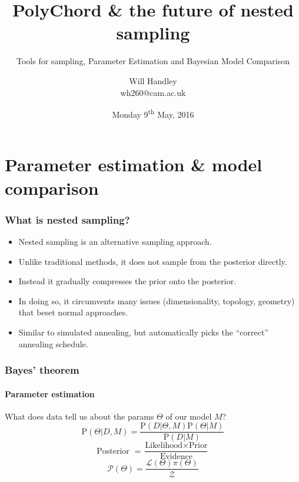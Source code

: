 \documentclass[]{beamer}
\title{PolyChord \& the future of nested sampling}
\subtitle{Tools for sampling, Parameter Estimation and Bayesian Model Comparison}
\author[Handley] %
{Will Handley\\ \small{wh260@cam.ac.uk}}
\institute[University of Cambridge] %
{%
Supervisors: Anthony Lasenby \& Mike Hobson \\
Astrophysics Group \\
Cavendish Laboratory \\
University of Cambridge
}
\date{Monday 9\textsuperscript{th} May, 2016}
\newcommand{\lik}{\mathcal{L}}
\newcommand{\posterior}{\mathcal{P}}
\newcommand{\prior}{\pi}
\newcommand{\ev}{\mathcal{Z}}
\newcommand{\prob}{\mathrm{P}}
\begin{document}
\begin{frame}
  \titlepage
\end{frame}

\begin{frame}
  \tableofcontents
\end{frame}


\section{Parameter estimation \& model comparison}
%
%
%

\begin{frame}
  \frametitle{What is nested sampling?}
  \begin{itemize}
    \pause\item Nested sampling is an alternative sampling approach. 
    \pause\item Unlike traditional methods, it does not sample from the posterior directly.
    \pause\item Instead it gradually compresses the prior onto the posterior.
    \pause\item In doing so, it circumvents many issues (dimensionality, topology, geometry) that beset normal approaches.
    \pause\item Similar to simulated annealing, but automatically picks the ``correct'' annealing schedule.
  \end{itemize}
\end{frame}

\begin{frame}
  \frametitle{Bayes' theorem}
  \framesubtitle{Parameter estimation}

  \pause
  What does data tell us about the params $\Theta$ of our model $M$?
    \[\prob(\Theta|D,M) = \frac{\prob(D|\Theta,M) \prob(\Theta|M) }{ \prob(D|M) }\] 
    \pause
    \[\text{Posterior } = \frac{\text{Likelihood} \times \text{Prior} } {\text{Evidence} }\] 
    \pause
    \[ \posterior(\Theta)= \frac{\lik(\Theta) \prior(\Theta)} {\ev}\] 

\end{frame}
\end{document}
